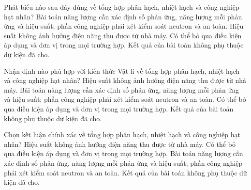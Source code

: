 \begin{ex}
Phát biểu nào sau đây đúng về tổng hợp phân hạch, nhiệt hạch và công nghiệp hạt nhân?
\choice
{\True Bài toán năng lượng cần xác định số phản ứng, năng lượng mỗi phản ứng và hiệu suất; phần công nghiệp phải xét kiểm soát neutron và an toàn.}
{Hiệu suất không ảnh hưởng điện năng thu được từ nhà máy.}
{Có thể bỏ qua điều kiện áp dụng và đơn vị trong mọi trường hợp.}
{Kết quả của bài toán không phụ thuộc dữ kiện đã cho.}
\end{ex}

\begin{ex}
Nhận định nào phù hợp với kiến thức Vật lí về tổng hợp phân hạch, nhiệt hạch và công nghiệp hạt nhân?
\choice
{Hiệu suất không ảnh hưởng điện năng thu được từ nhà máy.}
{\True Bài toán năng lượng cần xác định số phản ứng, năng lượng mỗi phản ứng và hiệu suất; phần công nghiệp phải xét kiểm soát neutron và an toàn.}
{Có thể bỏ qua điều kiện áp dụng và đơn vị trong mọi trường hợp.}
{Kết quả của bài toán không phụ thuộc dữ kiện đã cho.}
\end{ex}

\begin{ex}
Chọn kết luận chính xác về tổng hợp phân hạch, nhiệt hạch và công nghiệp hạt nhân?
\choice
{Hiệu suất không ảnh hưởng điện năng thu được từ nhà máy.}
{Có thể bỏ qua điều kiện áp dụng và đơn vị trong mọi trường hợp.}
{\True Bài toán năng lượng cần xác định số phản ứng, năng lượng mỗi phản ứng và hiệu suất; phần công nghiệp phải xét kiểm soát neutron và an toàn.}
{Kết quả của bài toán không phụ thuộc dữ kiện đã cho.}
\end{ex}

